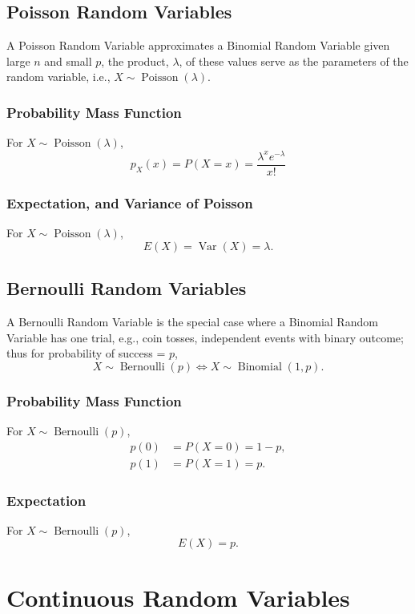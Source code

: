 \documentclass{amsart}
\DeclareMathOperator{\Var}{\text{Var}}
\DeclareMathOperator{\bin}{\text{Binomial}}
\DeclareMathOperator{\bern}{\text{Bernoulli}}
\DeclareMathOperator{\fish}{\text{Poisson}}
\begin{document}
		\subsection{Poisson Random Variables}
		A Poisson Random Variable approximates a Binomial Random Variable given large $n$ and small $p$, the product, $\lambda$, of these values serve as the parameters of the random variable, i.e., $X \sim \fish(\lambda)$.
				\subsubsection{Probability Mass Function}
				For $X \sim \fish(\lambda)$, 
					$$
						p_{X}(x) = P(X=x) = \frac{\lambda^{x}e^{-\lambda}}{x!}
					$$
					
				\subsubsection{Expectation, and Variance of Poisson} 
				For $X \sim \fish(\lambda)$,
					$$
						E(X) = \Var(X) = \lambda.
					$$
					
			\subsection{Bernoulli Random Variables}
			A Bernoulli Random Variable is the special case where a Binomial Random Variable has one trial, e.g., coin tosses, independent events with binary outcome; thus for probability of success = $p$, 
				$$
					X \sim \bern(p) \Leftrightarrow X \sim \bin(1,p).
				$$
			
				\subsubsection{Probability Mass Function}
				For $X \sim \bern(p)$,
					\begin{align*}
						p(0) &= P(X = 0) = 1 - p, \\
						p(1) &= P(X = 1) = p.
					\end{align*}
					
				\subsubsection{Expectation}
				For $X \sim \bern(p)$,
					$$
						E(X) = p.
					$$
				
		\section{Continuous Random Variables}
\end{document}
